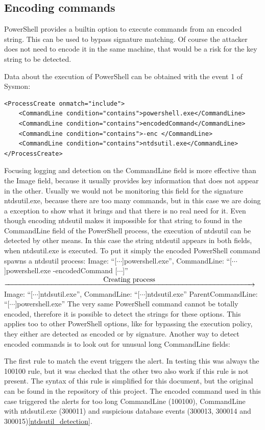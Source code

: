\subsection{Encoding commands}
PowerShell provides a builtin option to execute commands from an encoded string. This can be used to bypass signature matching. Of course the attacker does not need to encode it in the same machine, that would be a risk for the key string to be detected.
\linej

\linej
Data about the execution of PowerShell can be obtained with the event 1 of Sysmon:
\begin{lstlisting}[style=xml]
<ProcessCreate onmatch="include">
	<CommandLine condition="contains">powershell.exe</CommandLine>
	<CommandLine condition="contains">encodedCommand</CommandLine>
	<CommandLine condition="contains">-enc </CommandLine>
	<CommandLine condition="contains">ntdsutil.exe</CommandLine>
</ProcessCreate>
\end{lstlisting}
\linej
Focusing logging and detection on the CommandLine field is more effective than the Image field, because it usually provides key information that does not appear in the other. Usually we would not be monitoring this field for the signature ntdsutil.exe, because there are too many commands, but in this case we are doing a exception to show what it brings and that there is no real need for it.
\linej
Even though encoding ntdsutil makes it impossible for that string to found in the CommandLine field of the PowerShell process, the execution of ntdsutil can be detected by other means. In this case the string ntdsutil appears in both fields, when ntdsutil.exe is executed.
\linej
\linej
To put it simply the encoded PowerShell command spawns a ntdsutil process:
\linej
Image: ``[$\cdots$]powershell.exe'',
\linej
CommandLine: ``[$\cdots$]powershell.exe -encodedCommand [$\cdots$]''
\linej
$\xrightarrow{\makebox[\textwidth]{Creating process}}$
Image: ``[$\cdots$]ntdsutil.exe'',
\linej
CommandLine: ``[$\cdots$]ntdsutil.exe''
\linej
ParentCommandLine: ``[$\cdots$]powershell.exe''
\linej
\linej
\linej
The very same PowerShell command cannot be totally encoded, therefore it is possible to detect the strings for these options. This applies too to other PowerShell options, like for bypassing the execution policy, they either are detected as encoded or by signature\cite{powershell_adsecurity}.
Another way to detect encoded commands is to look out for unusual long CommandLine fields:

\linej
The first rule to match the event triggers the alert.
In testing this was always the 100100 rule, but it was checked that the other two also work if this rule is not present.
The syntax of this rule is simplified for this document, but the original can be found in the repository of this project\cite{memoria_github}.
\linej
\linej
The encoded command used in this case triggered the alerts for too long CommandLine (100100), CommandLine with ntdsutil.exe (300011) and suspicious database events (300013, 300014 and 300015)\ref{ntdsutil_detection}.

